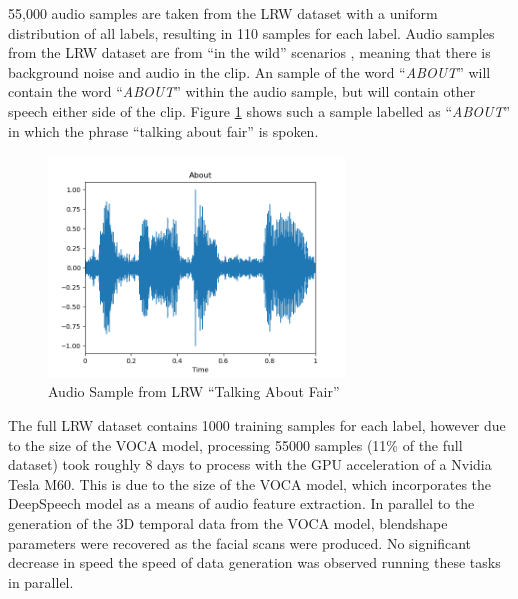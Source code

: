 55,000 audio samples are taken from the LRW dataset with a uniform distribution of all labels, resulting in 110 samples for each label.
Audio samples from the LRW dataset are from ``in the wild'' scenarios \cite{Cheng2016}, meaning that there is background noise and audio in the clip.
An sample of the word ``\textit{ABOUT}'' will contain the word ``\textit{ABOUT}'' within the audio sample, but will contain other speech either side of the clip.
Figure \ref{fig:LRW_About} shows such a sample labelled as ``\textit{ABOUT}'' in which the phrase ``talking about fair'' is spoken.

\begin{figure}[h]
    \centering
        \includegraphics[width=0.7\textwidth]{figures/about.png}
    \caption{Audio Sample from LRW \cite{Cheng2016} ``Talking About Fair''}\label{fig:LRW_About}
\end{figure}

The full LRW dataset contains 1000 training samples for each label, however due to the size of the VOCA model, processing 55000 samples (11\% of the full dataset) took roughly 8 days to process with the GPU acceleration of a Nvidia Tesla M60.
This is due to the size of the VOCA model, which incorporates the DeepSpeech model as a means of audio feature extraction.
In parallel to the generation of the 3D temporal data from the VOCA model, blendshape parameters were recovered as the facial scans were produced.
No significant decrease in speed the speed of data generation was observed running these tasks in parallel.

